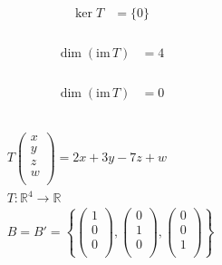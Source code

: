 \documentclass[fleqn, a4paper, twocolumn, draft]{article}
\theoremstyle{definition}
\theoremstyle{theorem}
\theoremstyle{remark}
\newcommand{\im}{\mathrm{im}\,}
\numberwithin{corollary}{theorem}
\numberwithin{equation}{theorem}
\begin{document}
\subsubsection{}

\begin{align*}
	\ker T &= \{0\}
\end{align*}

\subsubsection{}

\begin{align*}
	\dim (\im T) &= 4
\end{align*}

\subsubsection{}

\begin{align*}
	\dim (\im T) &= 0
\end{align*}

\subsection{}

\begin{gather*}
	T 
		\begin{pmatrix}
			x\\
			y\\
			z\\
			w\\
		\end{pmatrix}
	= 2x + 3y - 7z + w\\
	T : \mathbb{R}^4 \to \mathbb{R}\\
	B = B' = 
		\left\lbrace
			\begin{pmatrix}
				1\\
				0\\
				0\\
			\end{pmatrix}
			,
			\begin{pmatrix}
				0\\
				1\\
				0\\
			\end{pmatrix}
			,
			\begin{pmatrix}
				0\\
				0\\
				1\\
			\end{pmatrix}
		\right\rbrace
\end{gather*}
\end{document}
